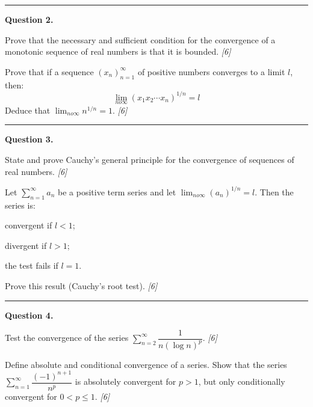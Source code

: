\documentclass[11pt,a4paper]{article}
\newcommand{\pts}[1]{\hfill   \textit{[#1]}}
\begin{document}
\medskip\rule{\linewidth}{0.2pt}

\medskip


\noindent   \textbf{Question 2.}

\begin{parts}
  \item Prove that the necessary and sufficient condition for the convergence of a monotonic sequence of real numbers is that it is bounded. \pts{6}
  \item Prove that if a sequence $(x_n)_{n=1}^\infty$ of positive numbers converges to a limit $l$, then:
  \[
  \lim_{n o\infty} (x_1 x_2 \cdots x_n)^{1/n} = l
  \]
  Deduce that $\lim_{n o\infty} n^{1/n} = 1$. \pts{6}
\end{parts}

\medskip\rule{\linewidth}{0.2pt}

\medskip


\noindent   \textbf{Question 3.}

\begin{parts}
  \item State and prove Cauchy's general principle for the convergence of sequences of real numbers. \pts{6}
  \item Let $\sum_{n=1}^\infty a_n$ be a positive term series and let $\lim_{n o\infty} (a_n)^{1/n} = l$. Then the series is:
  
\begin{parts}
    \item convergent if $l < 1$;
    \item divergent if $l > 1$;
    \item the test fails if $l = 1$.
  \end{parts}
  Prove this result (Cauchy's root test). \pts{6}
\end{parts}

\medskip\rule{\linewidth}{0.2pt}

\medskip


\noindent   \textbf{Question 4.}

\begin{parts}
  \item Test the convergence of the series $\sum_{n=2}^\infty \dfrac{1}{n(\log n)^p}$. \pts{6}
  \item Define absolute and conditional convergence of a series. Show that the series $\sum_{n=1}^\infty \dfrac{(-1)^{n+1}}{n^p}$ is absolutely convergent for $p > 1$, but only conditionally convergent for $0 < p \le 1$. \pts{6}
\end{parts}
\end{document}

